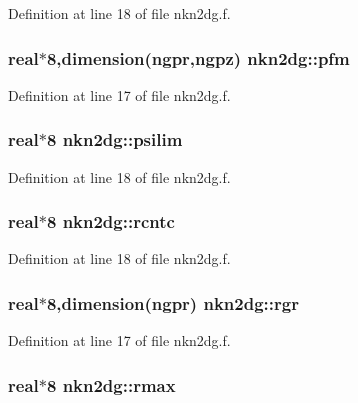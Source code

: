 Definition at line 18 of file nkn2dg.f.\hypertarget{namespacenkn2dg_cac07d272bf378866d1d4a0f5dc0db7a}{
\subsubsection[pfm]{\setlength{\rightskip}{0pt plus 5cm}real$\ast$8,dimension(ngpr,ngpz) {\bf nkn2dg::pfm}}}
\label{namespacenkn2dg_cac07d272bf378866d1d4a0f5dc0db7a}




Definition at line 17 of file nkn2dg.f.\hypertarget{namespacenkn2dg_4ab91cc0041ca344c9f72ed4109c6bbd}{
\subsubsection[psilim]{\setlength{\rightskip}{0pt plus 5cm}real$\ast$8 {\bf nkn2dg::psilim}}}
\label{namespacenkn2dg_4ab91cc0041ca344c9f72ed4109c6bbd}




Definition at line 18 of file nkn2dg.f.\hypertarget{namespacenkn2dg_ab7476f8d5f0b306f5873a3e62b9d84a}{
\subsubsection[rcntc]{\setlength{\rightskip}{0pt plus 5cm}real$\ast$8 {\bf nkn2dg::rcntc}}}
\label{namespacenkn2dg_ab7476f8d5f0b306f5873a3e62b9d84a}




Definition at line 18 of file nkn2dg.f.\hypertarget{namespacenkn2dg_0ec68e915a42a04daca06d6dbbf940c2}{
\subsubsection[rgr]{\setlength{\rightskip}{0pt plus 5cm}real$\ast$8,dimension(ngpr) {\bf nkn2dg::rgr}}}
\label{namespacenkn2dg_0ec68e915a42a04daca06d6dbbf940c2}




Definition at line 17 of file nkn2dg.f.\hypertarget{namespacenkn2dg_b5ad0e96c0a62c643cd273561f582713}{
\subsubsection[rmax]{\setlength{\rightskip}{0pt plus 5cm}real$\ast$8 {\bf nkn2dg::rmax}}}
\label{namespacenkn2dg_b5ad0e96c0a62c643cd273561f582713}




